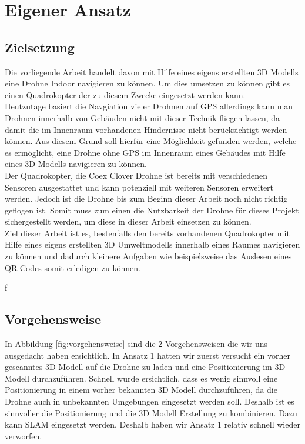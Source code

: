 \chapter{Eigener Ansatz}

\section{Zielsetzung}
Die vorliegende Arbeit handelt davon mit Hilfe eines eigens erstellten 3D Modells eine Drohne Indoor navigieren zu können. Um dies umsetzen zu können gibt es einen Quadrokopter der zu diesem Zwecke eingesetzt werden kann. \\
Heutzutage basiert die Navgiation vieler Drohnen auf \ac{GPS} allerdings kann man Drohnen innerhalb von Gebäuden nicht mit dieser Technik fliegen lassen, da damit die im Innenraum vorhandenen Hindernisse nicht berücksichtigt werden können. Aus diesem Grund soll hierfür eine Möglichkeit gefunden werden, welche es ermöglicht, eine Drohne ohne \ac{GPS} im Innenraum eines Gebäudes mit Hilfe eines 3D Modells navigieren zu können.\\
Der Quadrokopter, die Coex Clover Drohne ist bereits mit verschiedenen Sensoren ausgestattet und kann potenziell mit weiteren Sensoren erweitert werden. Jedoch ist die Drohne bis zum Beginn dieser Arbeit noch nicht richtig geflogen ist. Somit muss zum einen die Nutzbarkeit der Drohne für dieses Projekt sichergestellt werden, um diese in dieser Arbeit einsetzen zu können. \\
Ziel dieser Arbeit ist es, bestenfalls den bereits vorhandenen Quadrokopter mit Hilfe eines eigens erstellten 3D Umweltmodells innerhalb eines Raumes navigieren zu können und dadurch kleinere Aufgaben wie beispielsweise das Auslesen eines QR-Codes somit erledigen zu können.


f
\section{Vorgehensweise}

In Abbildung \ref{fig:vorgehensweise} sind die 2 Vorgehensweisen die wir uns ausgedacht haben ersichtlich. In Ansatz 1 hatten wir zuerst versucht ein vorher gescanntes 3D Modell auf die Drohne zu laden und eine Positionierung im 3D Modell durchzuführen. Schnell wurde ersichtlich, dass es wenig sinnvoll eine Positionierung in einem vorher bekannten 3D Modell durchzuführen, da die Drohne auch in unbekannten Umgebungen eingesetzt werden soll. Deshalb ist es sinnvoller die Positionierung und die 3D Modell Erstellung zu kombinieren. Dazu kann \ac{SLAM} eingesetzt werden. Deshalb haben wir Ansatz 1 relativ schnell wieder verworfen.

